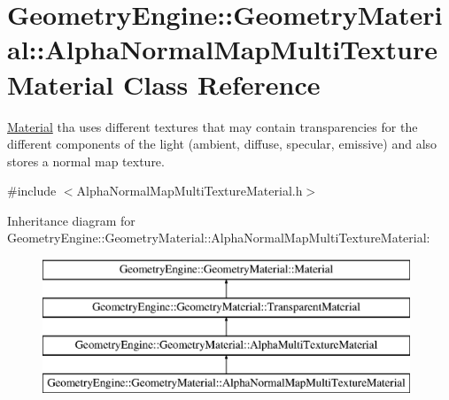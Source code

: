 \hypertarget{class_geometry_engine_1_1_geometry_material_1_1_alpha_normal_map_multi_texture_material}{}\section{Geometry\+Engine\+::Geometry\+Material\+::Alpha\+Normal\+Map\+Multi\+Texture\+Material Class Reference}
\label{class_geometry_engine_1_1_geometry_material_1_1_alpha_normal_map_multi_texture_material}


\mbox{\hyperlink{class_geometry_engine_1_1_geometry_material_1_1_material}{Material}} tha uses different textures that may contain transparencies for the different components of the light (ambient, diffuse, specular, emissive) and also stores a normal map texture.  




{\ttfamily \#include $<$Alpha\+Normal\+Map\+Multi\+Texture\+Material.\+h$>$}

Inheritance diagram for Geometry\+Engine\+::Geometry\+Material\+::Alpha\+Normal\+Map\+Multi\+Texture\+Material\+:\begin{figure}[H]
\begin{center}
\leavevmode
\includegraphics[height=4.000000cm]{class_geometry_engine_1_1_geometry_material_1_1_alpha_normal_map_multi_texture_material}
\end{center}
\end{figure}
